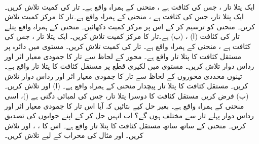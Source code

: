 \\
%
ایک پتلا تار ، جس کی کثافت  ہے ، منحنی  کے ہمراہ واقع  ہے۔ تار کی کمیت تلاش کریں۔
%
ایک پتلا تار،  جس کی کثافت  ہے ، منحنی  کے ہمراہ واقع ہے۔تار کا مرکز کمیت تلاش کریں۔  منحنی کو ترسیم کر کے اس پر مرکز کمیت دکھائیں۔
%
منحنی  کے ہمراہ  واقع پتلے  تار کی کثافت (ا) ، (ب)  ہے۔تار کا مرکز کمیت تلاش کریں۔
%
ایک پتلا تار ، جس کی کثافت  ہے ، منحنی   کے ہمراہ واقع ہے۔ تار کی کمیت تلاش کریں۔
%
مستوی  میں دائرہ  پر مستقل کثافت  کا پتلا تار واقع ہے۔ محور  کے لحاظ سے  تار کا جمودی معیار اثر اور رداس  دوار تلاش کریں۔
%
مستوی  میں لکیری قطع  پر مستقل کثافت  کا پتلا تار واقع ہے۔ تینوں محددی محوروں  کے لحاظ سے   تار کا جمودی معیار اثر اور رداس  دوار تلاش کریں۔
%
مستقل کثافت  کا پتلا تار پیچدار منحنی  کے ہمراہ واقع ہے۔ (ا)  اور  تلاش کریں۔ (ب) فرض کریں مستقل کثافت  کا دوسرا پتلا تار، جس کی لمبائی دگنی ہے ()، اسی منحنی  کے ہمراہ واقع ہے۔ بغیر حل کیے بتائیں کہ آیا اس تار کا جمودی معیار اثر اور رداس دوار پہلے تار سے مختلف ہوں گے؟  اب انہیں حل کر کے اپنے جوابوں  کی تصدیق کریں۔
%
منحنی  کے ساتھ ساتھ مستقل کثافت  کا  پتلا تار  واقع ہے۔ اس کا  ، ،  اور  تلاش کریں۔
%
 اور  مثال  کی محراب کے لیے تلاش کریں۔
